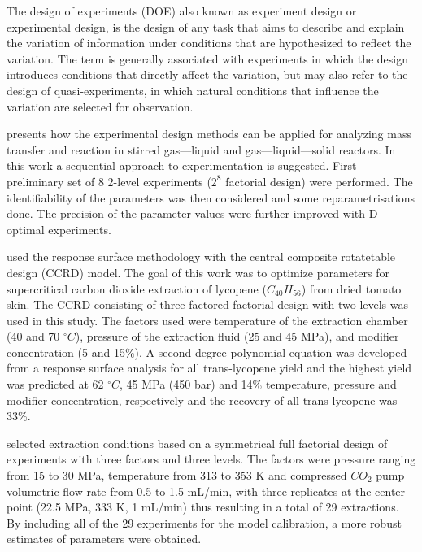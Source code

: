 \documentclass[../Article_Design_of_Experiment.tex]{subfiles}
\begin{document}
	
	The design of experiments (DOE) also known as experiment design or experimental design, is the design of any task that aims to describe and explain the variation of information under conditions that are hypothesized to reflect the variation. The term is generally associated with experiments in which the design introduces conditions that directly affect the variation, but may also refer to the design of quasi-experiments, in which natural conditions that influence the variation are selected for observation.
		
	\citet{Oinas1992} presents how the experimental design methods can be applied for analyzing mass transfer and reaction in stirred gas—liquid and gas—liquid—solid reactors. In this work a sequential approach to experimentation is suggested. First preliminary set of 8 2-level experiments ($2^8$ factorial design) were performed. The identifiability of the parameters was then considered and some reparametrisations done. The precision of the parameter values were further improved with D-optimal experiments. 
	
	\citet{Kassama2008} used the response surface methodology with the central composite rotatetable design (CCRD) model. The goal of this work was to optimize parameters for supercritical carbon dioxide extraction of lycopene ($C_{40}H_{56}$) from dried tomato skin. The CCRD consisting of three-factored factorial design with two levels was used in this study. The factors used were temperature of the extraction chamber (40 and 70 $^\circ C$), pressure of the extraction fluid (25 and 45 MPa), and modifier concentration (5 and 15\%). A second-degree polynomial equation was developed from a response surface analysis for all trans-lycopene yield and the highest yield was predicted at 62 $^\circ C$, 45 MPa (450 bar) and 14\% temperature, pressure and modifier concentration, respectively and the recovery of all trans-lycopene was 33\%.
	
	\citet{Abrahamsson2016} selected extraction conditions based on a symmetrical full factorial design of experiments with three factors and three levels. The factors were pressure ranging from 15 to 30 MPa, temperature from 313 to 353 K and compressed $CO_2$ pump volumetric flow rate from 0.5 to 1.5 mL/min, with three replicates at the center point (22.5 MPa, 333 K, 1 mL/min) thus resulting in a total of 29 extractions. By including all of the 29 experiments for the model calibration, a more robust estimates of parameters were obtained.
	
\end{document}
